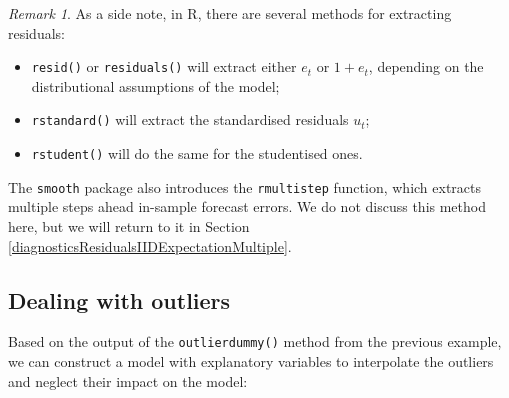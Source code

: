 \documentclass[]{book}
\newenvironment{Shaded}{\begin{snugshade}}{\end{snugshade}}
\newcommand{\CommentTok}[1]{\textcolor[rgb]{0.56,0.35,0.01}{\textit{#1}}}
\newcommand{\DataTypeTok}[1]{\textcolor[rgb]{0.13,0.29,0.53}{#1}}
\newcommand{\DecValTok}[1]{\textcolor[rgb]{0.00,0.00,0.81}{#1}}
\newcommand{\KeywordTok}[1]{\textcolor[rgb]{0.13,0.29,0.53}{\textbf{#1}}}
\newcommand{\NormalTok}[1]{#1}
\newcommand{\OperatorTok}[1]{\textcolor[rgb]{0.81,0.36,0.00}{\textbf{#1}}}
\newcommand{\StringTok}[1]{\textcolor[rgb]{0.31,0.60,0.02}{#1}}
\providecommand{\tightlist}{%
  \setlength{\itemsep}{0pt}\setlength{\parskip}{0pt}}
\theoremstyle{definition}
\theoremstyle{definition}
\theoremstyle{definition}
\theoremstyle{definition}
\theoremstyle{remark}
\newtheorem*{remark}{Remark}
\begin{document}
\begin{remark}
As a side note, in R, there are several methods for extracting residuals:

\begin{itemize}
\tightlist
\item
  \texttt{resid()} or \texttt{residuals()} will extract either \(e_t\) or \(1+e_t\), depending on the distributional assumptions of the model;
\item
  \texttt{rstandard()} will extract the standardised residuals \(u_t\);
\item
  \texttt{rstudent()} will do the same for the studentised ones.
\end{itemize}

The \texttt{smooth} package also introduces the \texttt{rmultistep} function, which extracts multiple steps ahead in-sample forecast errors. We do not discuss this method here, but we will return to it in Section \ref{diagnosticsResidualsIIDExpectationMultiple}.
\end{remark}

\hypertarget{dealing-with-outliers}{%
\subsection{Dealing with outliers}\label{dealing-with-outliers}}

Based on the output of the \texttt{outlierdummy()} method from the previous example, we can construct a model with explanatory variables to interpolate the outliers and neglect their impact on the model:

\begin{Shaded}
\end{Shaded}
\end{document}
